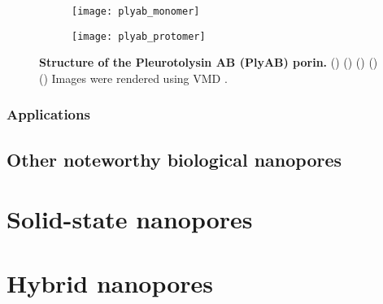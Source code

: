 \begin{figure*}[t]
\begin{minipage}{60mm}
\begin{subfigure}[t]{35mm}
      \texttt{[image: plyab\_monomer]}
    \end{subfigure}
    \begin{subfigure}[t]{24mm}
      \centering
      \caption{}\vspace{-8.5mm}\hspace{1.5mm}\label{fig:plyab_protomer}
      \texttt{[image: plyab\_protomer]}
    \end{subfigure}
  \end{minipage}
\caption{%
  \textbf{Structure of the Pleurotolysin AB (PlyAB) porin.}
  ()
  ()
  ()
  ()
  ()
  Images were rendered using VMD \cite{Humphrey-1996,Stone-1998}.
  }\label{fig:plyab_pore_structure}
\end{figure*}


\subsubsection{Applications}



\subsection{Other noteworthy biological nanopores}

\section{Solid-state nanopores}

\section{Hybrid nanopores}



\cleardoublepage

